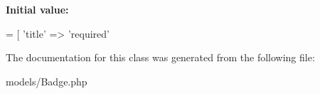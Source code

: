 {\bfseries Initial value\+:}
\begin{DoxyCode}
= [ 
        \textcolor{stringliteral}{'title'} => \textcolor{stringliteral}{'required'}
\end{DoxyCode}


The documentation for this class was generated from the following file\+:\begin{DoxyCompactItemize}
\item 
models/Badge.\+php\end{DoxyCompactItemize}
